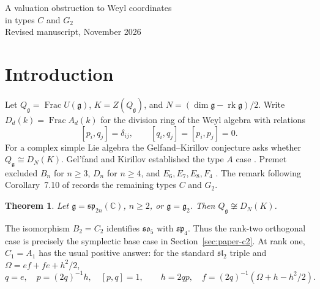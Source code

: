 \documentclass[11pt,a4paper]{article}
\newcommand{\C}{\mathbb C}
\newcommand{\Frac}{\operatorname{Frac}}
\newtheorem{theorem}{Theorem}[section]
\theoremstyle{definition}
\begin{document}
\thispagestyle{plain}
\begin{center}
{\LARGE A valuation obstruction to Weyl coordinates\\[4pt]in types \(C\) and \(G_2\)}\\[6pt]
{\small Revised manuscript, November 2026}
\end{center}
\begin{abstract}
We give a proposed proof that the quotient division rings of \(U(\mathfrak{sp}_{2n})\), \(n\ge2\), and \(U(\mathfrak g_2)\) are not Weyl division rings over their centres. An order filtration bounds the transcendence degree of a field of commuting positions. In rank two the bound follows from an unramified quaternion class on a conic bundle in characteristic \(p\). A parabolic localization transfers the symplectic rank-two obstruction to every \(n\ge3\).
\end{abstract}

\section{Introduction}
Let \(Q_{\mathfrak g}=\Frac U(\mathfrak g)\), \(K=Z(Q_{\mathfrak g})\), and
\(N=(\dim\mathfrak g-\operatorname{rk}\mathfrak g)/2\). Write
\(D_d(k)=\Frac A_d(k)\) for the division ring of the Weyl algebra with relations
\[
 [p_i,q_j]=\delta_{ij},\qquad [q_i,q_j]=[p_i,p_j]=0 .
\]
For a complex simple Lie algebra the Gelfand--Kirillov conjecture asks whether
\(Q_{\mathfrak g}\cong D_N(K)\). Gel'fand and Kirillov established the type \(A\) case \cite{GK}. Premet excluded \(B_n\) for \(n\ge3\), \(D_n\) for \(n\ge4\), and \(E_6,E_7,E_8,F_4\) \cite[Thm.~1.1]{PremetGK}. The remark following Corollary~7.10 of \cite{FHJS} records the remaining types \(C\) and \(G_2\).
\begin{theorem}\label{main}
Let \(\mathfrak g=\mathfrak{sp}_{2n}(\C)\), \(n\ge2\), or \(\mathfrak g=\mathfrak g_2\). Then \(Q_{\mathfrak g}\not\cong D_N(K)\).
\end{theorem}
The isomorphism \(B_2=C_2\) identifies \(\mathfrak{so}_5\) with \(\mathfrak{sp}_4\). Thus the rank-two orthogonal case is precisely the symplectic base case in Section~\ref{sec:paper-c2}. At rank one, \(C_1=A_1\) has the usual positive answer: for the standard \(\mathfrak{sl}_2\) triple and \(\Omega=ef+fe+h^2/2\),
\[
 q=e,\quad p=(2q)^{-1}h,\quad [p,q]=1,\qquad
 h=2qp,\quad f=(2q)^{-1}(\Omega+h-h^2/2).
\]
\end{document}
